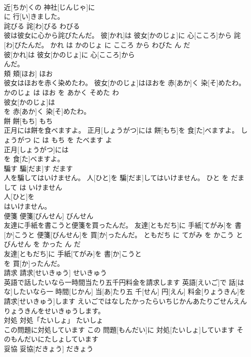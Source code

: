 \documentclass[8pt]{extreport}
\begin{document}
\begin{CJK}{UTF8}{min}
\\	近[ちか]くの 神社[じんじゃ]に
\\	に 行[い]きました。			
\\	詫びる	詫[わ]びる	わびる	
\\	彼は彼女に心から詫びたんだ。	彼[かれ]は 彼女[かのじょ]に 心[こころ]から 詫[わ]びたんだ。	かれ は かのじょ に こころ から わびた ん だ	
\\	彼[かれ]は 彼女[かのじょ]に 心[こころ]から
\\	んだ。			
\\	頬	頬[ほお]	ほお	
\\	彼女はほおを赤く染めたわ。	彼女[かのじょ]はほおを 赤[あか]く 染[そ]めたわ。	かのじょ は ほお を あかく そめた わ	
\\	彼女[かのじょ]は
\\	を 赤[あか]く 染[そ]めたわ。			
\\	餅	餅[もち]	もち	
\\	正月には餅を食べますよ。	正月[しょうがつ]には 餅[もち]を 食[た]べますよ。	しょうがつ に は もち を たべます よ	
\\	正月[しょうがつ]には
\\	を 食[た]べますよ。			
\\	騙す	騙[だま]す	だます	
\\	人を騙してはいけません。	人[ひと]を 騙[だま]してはいけません。	ひと を だまして は いけません	
\\	人[ひと]を
\\	はいけません。			
\\	便箋	便箋[びんせん]	びんせん	
\\	友達に手紙を書こうと便箋を買ったんだ。	友達[ともだち]に 手紙[てがみ]を 書[か]こうと 便箋[びんせん]を 買[か]ったんだ。	ともだち に てがみ を かこう と びんせん を かった ん だ	
\\	友達[ともだち]に 手紙[てがみ]を 書[か]こうと
\\	を 買[か]ったんだ。			
\\	請求	請求[せいきゅう]	せいきゅう	
\\	英語で話したいなら一時間当たり五千円料金を請求します	英語[えいご]で 話[はな]したいなら一 時間[じかん] 当[あ]たり五 千[せん] 円[えん] 料金[りょうきん]を 請求[せいきゅう]します	えいごではなしたかったらいちじかんあたりごせんえんりょうきんをせいきゅうします。	
\\	対処	対処「たいしょ」	たいしょ	
\\	この問題に対処しています	この 問題[もんだい]に 対処[たいしょ]しています	そのもんだいにたしょしています	
\\	妥協	妥協[だきょう]	だきょう	

\end{CJK}
\end{document}
